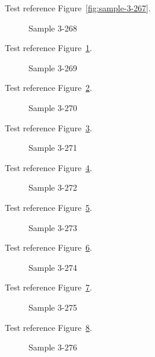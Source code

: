 Test reference Figure~\ref{fig:sample-3-267}.

\begin{figure}[tbhp]
\caption{Sample 3-268}
\label{fig:sample-3-268}
\end{figure}

Test reference Figure~\ref{fig:sample-3-268}.

\begin{figure}[tbhp]
\caption{Sample 3-269}
\label{fig:sample-3-269}
\end{figure}

Test reference Figure~\ref{fig:sample-3-269}.

\begin{figure}[tbhp]
\caption{Sample 3-270}
\label{fig:sample-3-270}
\end{figure}

Test reference Figure~\ref{fig:sample-3-270}.

\begin{figure}[tbhp]
\caption{Sample 3-271}
\label{fig:sample-3-271}
\end{figure}

Test reference Figure~\ref{fig:sample-3-271}.

\begin{figure}[tbhp]
\caption{Sample 3-272}
\label{fig:sample-3-272}
\end{figure}

Test reference Figure~\ref{fig:sample-3-272}.

\begin{figure}[tbhp]
\caption{Sample 3-273}
\label{fig:sample-3-273}
\end{figure}

Test reference Figure~\ref{fig:sample-3-273}.

\begin{figure}[tbhp]
\caption{Sample 3-274}
\label{fig:sample-3-274}
\end{figure}

Test reference Figure~\ref{fig:sample-3-274}.

\begin{figure}[tbhp]
\caption{Sample 3-275}
\label{fig:sample-3-275}
\end{figure}

Test reference Figure~\ref{fig:sample-3-275}.

\begin{figure}[tbhp]
\caption{Sample 3-276}
\label{fig:sample-3-276}
\end{figure}

